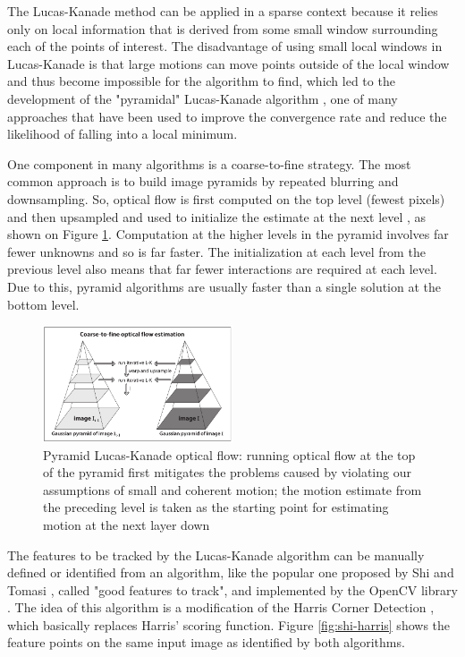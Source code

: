 \documentclass[msc, a4paper, classic, en]{ufbathesis}
\begin{document}
The Lucas-Kanade method can be applied in a sparse context because it relies only on local information that is derived from some small window surrounding each of the points of interest. The disadvantage of using small local windows in Lucas-Kanade is that large motions can move points outside of the local window and thus become impossible for the algorithm to find, which led to the development of the "pyramidal" Lucas-Kanade algorithm \cite{Bouguet00}, one of many approaches that have been used to improve the convergence rate and reduce the likelihood of falling into a local minimum.

One component in many algorithms is a coarse-to-fine strategy. The most common approach is to build image pyramids by repeated blurring and downsampling. So, optical flow is first computed on the top level (fewest pixels) and then upsampled and used to initialize the estimate at the next level \cite{dblk}, as shown on Figure \ref{fig:plk}. Computation at the higher levels in the pyramid involves far fewer unknowns and so is far faster. The initialization at each level from the previous level also means that far fewer interactions are required at each level. Due to this, pyramid algorithms are usually faster than a single solution at the bottom level.

\begin{figure}
\centering
\includegraphics[width=0.5\textwidth]{images/plk.png}
\caption{Pyramid Lucas-Kanade optical flow: running optical flow at the top of the pyramid first
\label{fig:plk}
mitigates the problems caused by violating our assumptions of small and coherent motion; the motion estimate from the preceding level is taken as the starting point for estimating motion at the next layer down \cite{bradski2008learning}}
\end{figure}

The features to be tracked by the Lucas-Kanade algorithm can be manually defined or identified from an algorithm, like the popular one proposed by Shi and Tomasi \cite{shi}, called "good features to track", and implemented by the OpenCV library \cite{opencv}. The idea of this algorithm is a modification of the Harris Corner Detection \cite{harris}, which basically replaces Harris' scoring function. Figure \ref{fig:shi-harris} shows the feature points on the same input image as identified by both algorithms.
\end{document}
